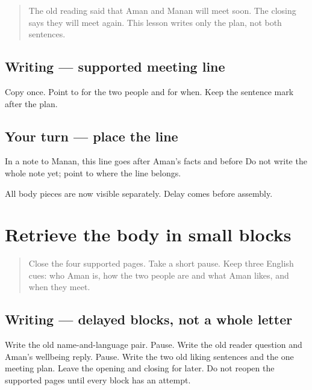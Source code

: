 \label{lesson:PA-W12-meeting-supported}



\begin{quote}
The old reading said that Aman and Manan will meet soon. The closing says they will meet again. This lesson writes only the plan, not both sentences.
\end{quote}

\subsection*{Writing — supported meeting line}
Copy \textbf{  } once. Point to \textbf{} for the two people and \textbf{} for when. Keep the sentence mark after the plan.

\subsection*{Your turn — place the line}
In a note to Manan, this line goes after Aman's facts and before \textbf{  } Do not write the whole note yet; point to where the line belongs.

\begin{tcolorbox}[breakable,colback=teal!4,colframe=teal!35!black,title={Before you move on}]
All body pieces are now visible separately. Delay comes before assembly.
\end{tcolorbox}
\section[(delayed message body blocks)]{Retrieve the body in small blocks}

\label{lesson:PA-W12-body-blocks-delayed}



\begin{quote}
Close the four supported pages. Take a short pause. Keep three English cues: who Aman is, how the two people are and what Aman likes, and when they meet.
\end{quote}

\subsection*{Writing — delayed blocks, not a whole letter}
Write the old name-and-language pair. Pause. Write the old reader question and Aman's wellbeing reply. Pause. Write the two old liking sentences and the one meeting plan. Leave the opening and closing for later. Do not reopen the supported pages until every block has an attempt.

